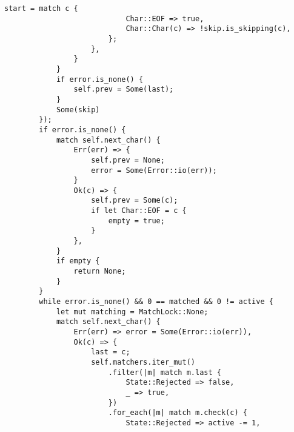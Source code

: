\clearpage
\begin{lstlisting}[caption={Типаж лексического анализатора и его стандартная реализация (часть 5)}, label={lst:rust_lexer5}]
                        start = match c {
                            Char::EOF => true,
                            Char::Char(c) => !skip.is_skipping(c),
                        };
                    },
                }
            }
            if error.is_none() {
                self.prev = Some(last);
            }
            Some(skip)
        });
        if error.is_none() {
            match self.next_char() {
                Err(err) => {
                    self.prev = None;
                    error = Some(Error::io(err));
                }
                Ok(c) => {
                    self.prev = Some(c);
                    if let Char::EOF = c {
                        empty = true;
                    }
                },
            }
            if empty {
                return None;
            }
        }
        while error.is_none() && 0 == matched && 0 != active {
            let mut matching = MatchLock::None;
            match self.next_char() {
                Err(err) => error = Some(Error::io(err)),
                Ok(c) => {
                    last = c;
                    self.matchers.iter_mut()
                        .filter(|m| match m.last {
                            State::Rejected => false,
                            _ => true,
                        })
                        .for_each(|m| match m.check(c) {
                            State::Rejected => active -= 1,
\end{lstlisting}
\clearpage

